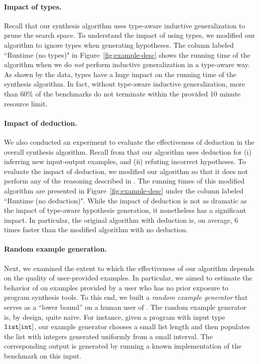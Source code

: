 \paragraph{Impact of types.} Recall that our synthesis algorithm uses
type-aware inductive generalization to prune the search space. To
understand the impact of using types, we modified our algorithm to
ignore types when generating hypotheses. The column labeled ``Runtime
(no types)" in Figure~\ref{fig:example-desc} shows the running time of
the algorithm when we do \emph{not} perform inductive generalization
in a type-aware way. As shown by the data, types have a huge impact on
the running time of the synthesis algorithm. In fact, without
type-aware inductive generalization, more than $60\%$ of the
benchmarks do not terminate within the provided 10 minute resource
limit.


\paragraph{Impact of deduction.} We also conducted an experiment to
evaluate the effectiveness of deduction in the overall synthesis
algorithm. Recall from  that our algorithm uses deduction
for (i) inferring new input-output examples, and (ii) refuting 
incorrect hypotheses. To evaluate the impact of deduction, we modified
our algorithm so that it does not perform any of the reasoning
described in . The running times of this modified
algorithm are presented in Figure~\ref{fig:example-desc} under the
column labeled ``Runtime (no deduction)". While the impact of
deduction is not as dramatic as the impact of type-aware hypothesis
generation, it nonetheless has a significant impact. In
particular, the original algorithm with deduction is, on average, 6
times faster than the modified algorithm with no deduction.


\paragraph{Random example generation.} Next, we examined the extent to
which the effectiveness of our algorithm depends on the quality of
user-provided examples. In particular, we aimed to estimate the
behavior of \sys on examples provided by a user who has no prior
exposure to program synthesis tools.
To this end, we built a {\em random example generator} that serves as
a ``lower bound'' on a human user of \sys.  The random example
generator is, by design, quite {naive}.  For instance, given a program
with input type ${\tt list[int]}$, our example generator chooses a
small list length and %
then populates the list with integers generated uniformly from a small
interval.  The corresponding output is generated by running a known
implementation of the benchmark on this input. 

